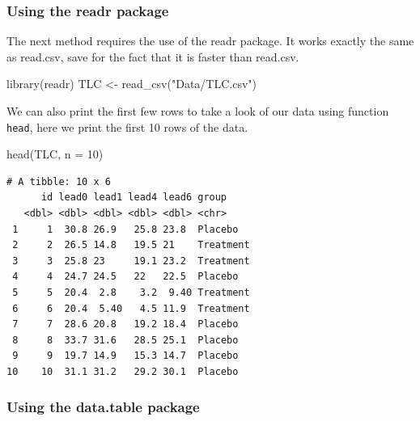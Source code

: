\documentclass[
  letterpaper,
  DIV=11,
  numbers=noendperiod]{scrreprt}
\newenvironment{Shaded}{\begin{snugshade}}{\end{snugshade}}
\newcommand{\AttributeTok}[1]{\textcolor[rgb]{0.40,0.45,0.13}{#1}}
\newcommand{\DecValTok}[1]{\textcolor[rgb]{0.68,0.00,0.00}{#1}}
\newcommand{\FunctionTok}[1]{\textcolor[rgb]{0.28,0.35,0.67}{#1}}
\newcommand{\NormalTok}[1]{\textcolor[rgb]{0.00,0.23,0.31}{#1}}
\newcommand{\OtherTok}[1]{\textcolor[rgb]{0.00,0.23,0.31}{#1}}
\newcommand{\StringTok}[1]{\textcolor[rgb]{0.13,0.47,0.30}{#1}}
\begin{document}
\hypertarget{using-the-readr-package}{%
\subsubsection*{Using the readr package}\label{using-the-readr-package}}

The next method requires the use of the readr package. It works exactly
the same as read.csv, save for the fact that it is faster than read.csv.

\begin{Shaded}
\begin{Highlighting}[]
\FunctionTok{library}\NormalTok{(readr)}
\NormalTok{TLC }\OtherTok{\textless{}{-}} \FunctionTok{read\_csv}\NormalTok{(}\StringTok{"Data/TLC.csv"}\NormalTok{)}
\end{Highlighting}
\end{Shaded}

We can also print the first few rows to take a look of our data using
function \texttt{head}, here we print the first 10 rows of the data.

\begin{Shaded}
\begin{Highlighting}[]
\FunctionTok{head}\NormalTok{(TLC, }\AttributeTok{n =} \DecValTok{10}\NormalTok{)}
\end{Highlighting}
\end{Shaded}

\begin{verbatim}
# A tibble: 10 x 6
      id lead0 lead1 lead4 lead6 group    
   <dbl> <dbl> <dbl> <dbl> <dbl> <chr>    
 1     1  30.8 26.9   25.8 23.8  Placebo  
 2     2  26.5 14.8   19.5 21    Treatment
 3     3  25.8 23     19.1 23.2  Treatment
 4     4  24.7 24.5   22   22.5  Placebo  
 5     5  20.4  2.8    3.2  9.40 Treatment
 6     6  20.4  5.40   4.5 11.9  Treatment
 7     7  28.6 20.8   19.2 18.4  Placebo  
 8     8  33.7 31.6   28.5 25.1  Placebo  
 9     9  19.7 14.9   15.3 14.7  Placebo  
10    10  31.1 31.2   29.2 30.1  Placebo  
\end{verbatim}

\hypertarget{using-the-data.table-package}{%
\subsubsection*{Using the data.table
package}\label{using-the-data.table-package}}
\end{document}
